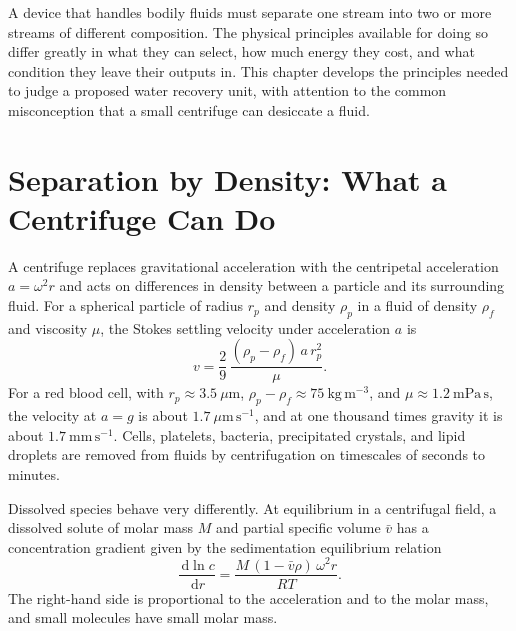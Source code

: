 \documentclass[11pt,openany]{book}
\theoremstyle{definition}
\theoremstyle{remark}
\newcommand{\dd}{\,\mathrm{d}}
\begin{document}
A device that handles bodily fluids must separate one stream into two or more streams of different composition. The physical principles available for doing so differ greatly in what they can select, how much energy they cost, and what condition they leave their outputs in. This chapter develops the principles needed to judge a proposed water recovery unit, with attention to the common misconception that a small centrifuge can desiccate a fluid.

\section{Separation by Density: What a Centrifuge Can Do}

A centrifuge replaces gravitational acceleration with the centripetal acceleration $a=\omega^2 r$ and acts on differences in density between a particle and its surrounding fluid. For a spherical particle of radius $r_p$ and density $\rho_p$ in a fluid of density $\rho_f$ and viscosity $\mu$, the Stokes settling velocity under acceleration $a$ is
\begin{equation}
v=\frac{2}{9}\,\frac{(\rho_p-\rho_f)\,a\,r_p^{2}}{\mu}.
\label{eq:stokes}
\end{equation}
For a red blood cell, with $r_p\approx3.5\ \mu\mathrm{m}$, $\rho_p-\rho_f\approx75\ \mathrm{kg\,m^{-3}}$, and $\mu\approx1.2\ \mathrm{mPa\,s}$, the velocity at $a=g$ is about $1.7\ \mu\mathrm{m\,s^{-1}}$, and at one thousand times gravity it is about $1.7\ \mathrm{mm\,s^{-1}}$. Cells, platelets, bacteria, precipitated crystals, and lipid droplets are removed from fluids by centrifugation on timescales of seconds to minutes.

Dissolved species behave very differently. At equilibrium in a centrifugal field, a dissolved solute of molar mass $M$ and partial specific volume $\bar v$ has a concentration gradient given by the sedimentation equilibrium relation
\begin{equation}
\frac{\dd\ln c}{\dd r}=\frac{M\,(1-\bar v\rho)\,\omega^2 r}{RT}.
\label{eq:sedeq}
\end{equation}
The right-hand side is proportional to the acceleration and to the molar mass, and small molecules have small molar mass.
\end{document}
